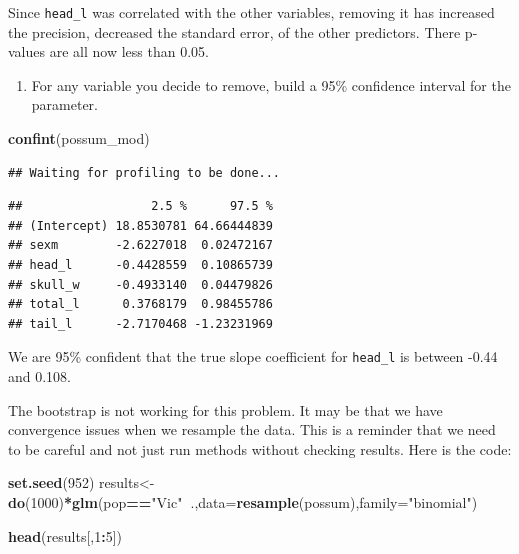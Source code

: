 \documentclass[
]{book}
\newenvironment{Shaded}{\begin{snugshade}}{\end{snugshade}}
\newcommand{\DataTypeTok}[1]{\textcolor[rgb]{0.13,0.29,0.53}{#1}}
\newcommand{\DecValTok}[1]{\textcolor[rgb]{0.00,0.00,0.81}{#1}}
\newcommand{\KeywordTok}[1]{\textcolor[rgb]{0.13,0.29,0.53}{\textbf{#1}}}
\newcommand{\NormalTok}[1]{#1}
\newcommand{\OperatorTok}[1]{\textcolor[rgb]{0.81,0.36,0.00}{\textbf{#1}}}
\newcommand{\StringTok}[1]{\textcolor[rgb]{0.31,0.60,0.02}{#1}}
\providecommand{\tightlist}{%
  \setlength{\itemsep}{0pt}\setlength{\parskip}{0pt}}
\begin{document}
Since \texttt{head\_l} was correlated with the other variables, removing it has increased the precision, decreased the standard error, of the other predictors. There p-values are all now less than 0.05.

\begin{enumerate}
\def\labelenumi{\alph{enumi}.}
\setcounter{enumi}{3}
\tightlist
\item
  For any variable you decide to remove, build a 95\% confidence interval for the parameter.
\end{enumerate}

\begin{Shaded}
\begin{Highlighting}[]
\KeywordTok{confint}\NormalTok{(possum_mod)}
\end{Highlighting}
\end{Shaded}

\begin{verbatim}
## Waiting for profiling to be done...
\end{verbatim}

\begin{verbatim}
##                  2.5 %      97.5 %
## (Intercept) 18.8530781 64.66444839
## sexm        -2.6227018  0.02472167
## head_l      -0.4428559  0.10865739
## skull_w     -0.4933140  0.04479826
## total_l      0.3768179  0.98455786
## tail_l      -2.7170468 -1.23231969
\end{verbatim}

We are 95\% confident that the true slope coefficient for \texttt{head\_l} is between -0.44 and 0.108.

The bootstrap is not working for this problem. It may be that we have convergence issues when we resample the data. This is a reminder that we need to be careful and not just run methods without checking results. Here is the code:

\begin{Shaded}
\begin{Highlighting}[]
\KeywordTok{set.seed}\NormalTok{(}\DecValTok{952}\NormalTok{)}
\NormalTok{results<-}\KeywordTok{do}\NormalTok{(}\DecValTok{1000}\NormalTok{)}\OperatorTok{*}\KeywordTok{glm}\NormalTok{(pop}\OperatorTok{==}\StringTok{"Vic"}\OperatorTok{~}\NormalTok{.,}\DataTypeTok{data=}\KeywordTok{resample}\NormalTok{(possum),}\DataTypeTok{family=}\StringTok{"binomial"}\NormalTok{)}
\end{Highlighting}
\end{Shaded}

\begin{Shaded}
\begin{Highlighting}[]
\KeywordTok{head}\NormalTok{(results[,}\DecValTok{1}\OperatorTok{:}\DecValTok{5}\NormalTok{])}
\end{Highlighting}
\end{Shaded}
\end{document}
